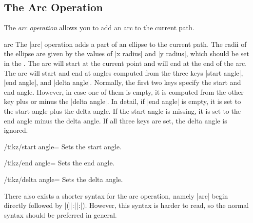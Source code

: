 \subsection{The Arc Operation}

The \emph{arc operation} allows you to add an arc to the current path.
%
\begin{pathoperation}{arc}{}
    The |arc| operation adds a part of an ellipse to the current path. The
    radii of the ellipse are given by the values of |x radius| and |y radius|,
    which should be set in the . The arc will start at   the
    current point and will end at the end of the arc. The arc  will start and
    end at angles computed from the three keys |start angle|, |end angle|, and
    |delta angle|. Normally, the first two keys specify the start and end
    angle. However, in case one of them is empty, it is computed from the other
    key plus or minus the |delta angle|. In detail, if |end angle| is empty, it
    is set to the start angle plus the delta angle. If the start angle is
    missing, it is set to the end angle minus the delta angle. If all three
    keys are set, the delta angle is ignored.
    \begin{key}{/tikz/start angle=}
        Sets the start angle.
    \end{key}
    \begin{key}{/tikz/end angle=}
        Sets the end angle.
    \end{key}
    \begin{key}{/tikz/delta angle=}
        Sets the delta angle.
    \end{key}

\begin{codeexample}[]
\end{codeexample}

\begin{codeexample}[]
\end{codeexample}

    There also exists a shorter syntax for the arc operation, namely |arc|
    begin directly followed by
    |(||:||:|). However, this
    syntax is harder to read, so the normal syntax should be preferred in
    general.
\end{pathoperation}


